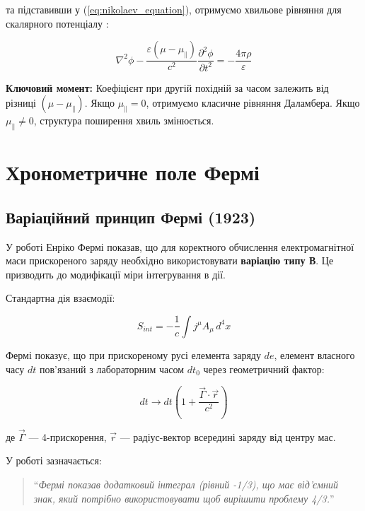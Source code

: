 \documentclass[12pt, a4paper]{article}
\begin{document}
та підставивши у (\ref{eq:nikolaev_equation}), отримуємо хвильове рівняння для скалярного потенціалу \cite{NikolaevLorentz}:

\begin{equation}
\nabla^2 \phi - \frac{\varepsilon(\mu - \mu_{\parallel})}{c^2} \frac{\partial^2 \phi}{\partial t^2} = -\frac{4\pi\rho}{\varepsilon}
\label{eq:wave_equation_modified}
\end{equation}

\textbf{Ключовий момент:} Коефіцієнт при другій похідній за часом залежить від різниці $(\mu - \mu_{\parallel})$. Якщо $\mu_{\parallel} = 0$, отримуємо класичне рівняння Даламбера. Якщо $\mu_{\parallel} \neq 0$, структура поширення хвиль змінюється.

\section{Хронометричне поле Фермі}

\subsection{Варіаційний принцип Фермі (1923)}

У роботі \cite{Fermi1923} Енріко Фермі показав, що для коректного обчислення електромагнітної маси прискореного заряду необхідно використовувати \textbf{варіацію типу В}. Це призводить до модифікації міри інтегрування в дії.

Стандартна дія взаємодії:

\begin{equation}
S_{int} = -\frac{1}{c} \int j^\mu A_\mu \, d^4x
\label{eq:action_standard}
\end{equation}

Фермі показує, що при прискореному русі елемента заряду $de$, елемент власного часу $dt$ пов'язаний з лабораторним часом $dt_0$ через геометричний фактор:

\begin{equation}
dt \longrightarrow dt \left( 1 + \frac{\vec{\Gamma} \cdot \vec{r}}{c^2} \right)
\label{eq:fermi_correction}
\end{equation}

де $\vec{\Gamma}$ --- 4-прискорення, $\vec{r}$ --- радіус-вектор всередині заряду від центру мас.

У роботі \cite{FermiSolution} зазначається:

\begin{quote}
``\textit{Фермі показав додатковий інтеграл (рівний -1/3), що має від'ємний знак, який потрібно використовувати щоб вирішити проблему 4/3.}''
\end{quote}
\end{document}
